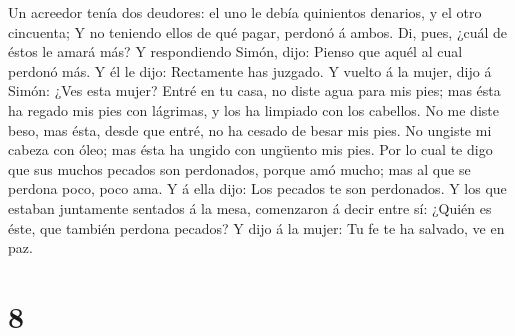  Un acreedor tenía dos deudores: el uno le debía quinientos
denarios, y el otro cincuenta;  Y no teniendo ellos de qué
pagar, perdonó á ambos. Di, pues, ¿cuál de éstos le amará más?
 Y respondiendo Simón, dijo: Pienso que aquél al cual
perdonó más. Y él le dijo: Rectamente has juzgado.  Y
vuelto á la mujer, dijo á Simón: ¿Ves esta mujer? Entré en tu casa, no
diste agua para mis pies; mas ésta ha regado mis pies con lágrimas, y
los ha limpiado con los cabellos.  No me diste beso, mas
ésta, desde que entré, no ha cesado de besar mis pies.  No
ungiste mi cabeza con óleo; mas ésta ha ungido con ungüento mis pies.
 Por lo cual te digo que sus muchos pecados son perdonados,
porque amó mucho; mas al que se perdona poco, poco ama.  Y
á ella dijo: Los pecados te son perdonados.  Y los que
estaban juntamente sentados á la mesa, comenzaron á decir entre sí:
¿Quién es éste, que también perdona pecados?  Y dijo á la
mujer: Tu fe te ha salvado, ve en paz.

\hypertarget{section-7}{%
\section{8}\label{section-7}}

